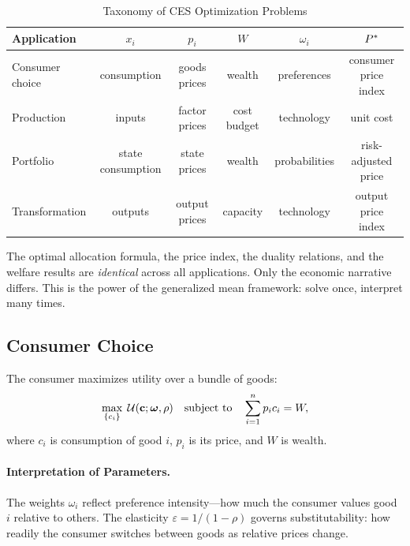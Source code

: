 \begin{table}[H]
\centering
\caption{Taxonomy of CES Optimization Problems}
\label{tab:taxonomy}
\renewcommand{\arraystretch}{1.4}
\begin{tabular}{@{}l c c c c c@{}}
\toprule
\textbf{Application} & $x_i$ & $p_i$ & $W$ & $\omega_i$ & $P^{*}$ \\
\midrule
Consumer choice & consumption & goods prices & wealth & preferences & consumer price index \\[2pt]
Production & inputs & factor prices & cost budget & technology & unit cost \\[2pt]
Portfolio & state consumption & state prices & wealth & probabilities & risk-adjusted price \\[2pt]
Transformation & outputs & output prices & capacity & technology & output price index \\
\bottomrule
\end{tabular}
\end{table}

\begin{calloutimportant}
The optimal allocation formula, the price index, the duality relations, and the welfare results are \emph{identical} across all applications. Only the economic narrative differs. This is the power of the generalized mean framework: solve once, interpret many times.
\end{calloutimportant}

\subsection{Consumer Choice}
\label{subsec:consumer-choice}

The consumer maximizes utility over a bundle of goods:
\begin{equation}
\max_{\{c_i\}} \; \mathcal{U}(\mathbf{c}; \boldsymbol{\omega}, \rho) \quad \text{subject to} \quad \sum_{i=1}^{n} p_i c_i = W,
\end{equation}
where $c_i$ is consumption of good $i$, $p_i$ is its price, and $W$ is wealth.

\paragraph{Interpretation of Parameters.}
The weights $\omega_i$ reflect preference intensity---how much the consumer values good $i$ relative to others. The elasticity $\varepsilon = 1/(1-\rho)$ governs substitutability: how readily the consumer switches between goods as relative prices change.

